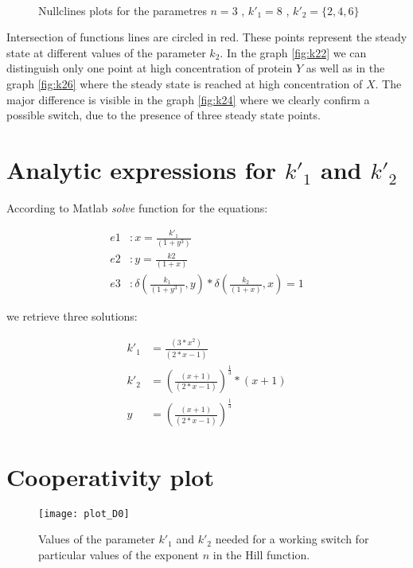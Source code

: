 \begin{figure}[h!]
  \centering
  ~
  ~
  \caption{Nullclines plots for the parametres $n = 3$ , $k'_1 = 8$ , $k'_2 =
  \{2,4,6\}$}
  \label{fig:nullclinesplots}
\end{figure}

Intersection of functions lines are circled in red. These points represent the
steady state at different values of the parameter $k_2$. In the graph
\ref{fig:k22} we can distinguish only one point at high concentration of protein
$Y$ as well as in the graph \ref{fig:k26} where the steady state is reached at
high concentration of $X$. The major difference is visible in the graph
\ref{fig:k24} where we clearly confirm a possible switch, due to the
presence of three steady state points.

\section{Analytic expressions for $k'_1$ and $k'_2$}

According to Matlab \emph{solve} function for the
equations:

\begin{subequations}
	\begin{align}
		e1 &: x = \frac{k'_1}{(1+y^3)}\\
		e2 &: y = \frac{k2}{(1+x)}\\
		e3 &: \delta(\frac{k_1}{(1+y^3)}, y)*\delta(\frac{k_2}{(1+x)},x) = 1
	\end{align}
\end{subequations}



we retrieve three solutions:

\begin{subequations}
	\begin{align}
		k'_1 &=\frac{(3*x^2)}{(2*x - 1)}\\ 
		k'_2 &=\left(\frac{(x + 1)}{(2*x - 1)}\right)^\frac{1}{3}*(x + 1)\\
		y &= \left(\frac{(x + 1)}{(2*x - 1)}\right)^\frac{1}{3}
	\end{align}
\end{subequations}

\section{Cooperativity plot}


\begin{figure}[h]
  	\centering
    \texttt{[image: plot\_D0]}
    \caption{Values of the parameter $k'_1$ and $k'_2$ needed for a working switch
 	for particular values of the exponent $n$ in the Hill function. }
	\label{fig:bifurcatingplot}
\end{figure}







